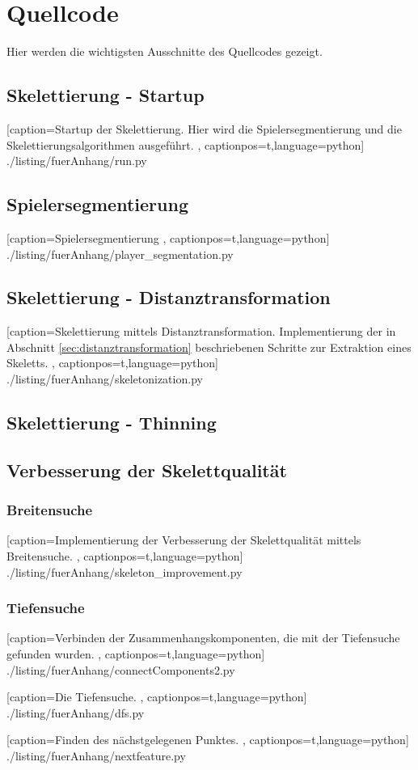 \chapter{Quellcode}
\label{anhang:quellcode}
Hier werden die wichtigsten Ausschnitte des Quellcodes gezeigt. 
\section{Skelettierung - Startup}
 
    [caption={Startup der Skelettierung. Hier wird die Spielersegmentierung und die Skelettierungsalgorithmen ausgeführt.}
       \label{lst:startup},
       captionpos=t,language=python]
 {./listing/fuerAnhang/run.py}
\section{Spielersegmentierung}

    [caption={Spielersegmentierung}
       \label{lst:anhang_spielersegmentierung},
       captionpos=t,language=python]
 {./listing/fuerAnhang/player_segmentation.py}
\section{Skelettierung - Distanztransformation}

    [caption={Skelettierung mittels Distanztransformation. Implementierung der in Abschnitt \ref{sec:distanztransformation} beschriebenen Schritte zur Extraktion eines Skeletts.}
       \label{lst:anhang_distanztransformation},
       captionpos=t,language=python]
 {./listing/fuerAnhang/skeletonization.py}
\section{Skelettierung - Thinning}
\section{Verbesserung der Skelettqualität}
\subsection{Breitensuche}
 
    [caption={Implementierung der Verbesserung der Skelettqualität mittels Breitensuche.}
       \label{lst:breitensuche},
       captionpos=t,language=python]
 {./listing/fuerAnhang/skeleton_improvement.py}
 \newpage
\subsection{Tiefensuche}

    [caption={Verbinden der Zusammenhangskomponenten, die mit der Tiefensuche gefunden wurden.}
       \label{lst:connectcomponents},
       captionpos=t,language=python]
 {./listing/fuerAnhang/connectComponents2.py}
 
 
     [caption={Die Tiefensuche.}
        \label{lst:tiefensuche},
        captionpos=t,language=python]
  {./listing/fuerAnhang/dfs.py}
  
 
      [caption={Finden des nächstgelegenen Punktes.}
         \label{lst:findnextfeature},
         captionpos=t,language=python]
   {./listing/fuerAnhang/nextfeature.py}